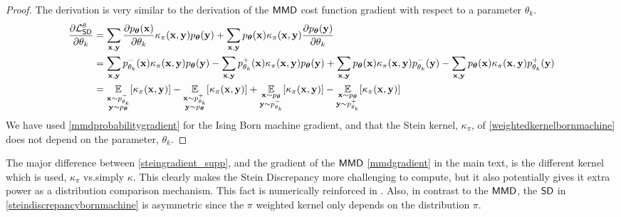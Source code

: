 \begin{proof}
The derivation is very similar to the derivation of the $\operatorname{\textsf{MMD}}$ cost function gradient with respect to a parameter $\theta_k$.
\begin{align*}
    \frac{\partial \mathcal{L}^{\theta}_{\operatorname{\textsf{SD}}}}{\partial \theta_k} &= \sum\limits_{\mathbf{x}, \mathbf{y}} \frac{\partial p_{\boldsymbol\theta}(\mathbf{x})}{\partial \theta_k} \kappa_\pi(\mathbf{x}, \mathbf{y}) p_{\boldsymbol\theta}(\mathbf{y}) +  \sum\limits_{\mathbf{x}, \mathbf{y}} p_{\boldsymbol\theta}(\mathbf{x})\kappa_\pi(\mathbf{x}, \mathbf{y})   \frac{\partial p_{\boldsymbol\theta}(\mathbf{y})}{\partial \theta_k}\\
    &=  \sum\limits_{\mathbf{x}, \mathbf{y}}p^-_{\theta_k}(\mathbf{x})  \kappa_\pi(\mathbf{x}, \mathbf{y}) p_{\boldsymbol\theta}(\mathbf{y}) -  \sum\limits_{\mathbf{x}, \mathbf{y}}p^+_{\theta_k}(\mathbf{x})  \kappa_\pi(\mathbf{x}, \mathbf{y}) p_{\boldsymbol\theta}(\mathbf{y}) +\sum\limits_{\mathbf{x}, \mathbf{y}} p_{\boldsymbol\theta}(\mathbf{x})\kappa_\pi(\mathbf{x}, \mathbf{y})   p^-_{\theta_k}(\mathbf{y}) -  \sum\limits_{\mathbf{x}, \mathbf{y}} p_{\boldsymbol\theta}(\mathbf{x})\kappa_\pi(\mathbf{x}, \mathbf{y})p^+_{\theta_k}(\mathbf{y})\\
    & = \underset{\substack{\mathbf{x} \sim p^-_{\theta_k} \\ \mathbf{y}\sim p_{\boldsymbol\theta}}}{\mathbb{E}}[\kappa_\pi(\mathbf{x}, \mathbf{y})] - \underset{\substack{\mathbf{x} \sim p^+_{\theta_k} \\ \mathbf{y}\sim p_{\boldsymbol\theta}}}{\mathbb{E}}[\kappa_\pi(\mathbf{x}, \mathbf{y})] +\underset{\substack{\mathbf{x} \sim p_{\boldsymbol\theta}\\ \mathbf{y}\sim p^-_{\theta_k}}}{\mathbb{E}}[\kappa_\pi(\mathbf{x}, \mathbf{y})] - \underset{\substack{\mathbf{x} \sim p_{\boldsymbol\theta} \\ \mathbf{y}\sim p^+_{\theta_k}}}{\mathbb{E}}[\kappa_\pi(\mathbf{x}, \mathbf{y})]
\end{align*}
We have used \eqref{mmdprobabilitygradient} for the Ising Born machine gradient,  and that the Stein kernel, $\kappa_{\pi}$, of \eqref{weightedkernelbornmachine} does not depend on the parameter, ${\theta_k}$.

\end{proof}

The major difference between \eqref{steingradient_supp}, and the gradient of the $\operatorname{\textsf{MMD}}$ \eqref{mmdgradient} in the main text, is the different kernel which is used, $\kappa_\pi$ vs.\@ simply $\kappa$. This clearly makes the Stein Discrepancy more challenging to compute, but it also potentially gives it extra power as a distribution comparison mechanism. This fact is numerically reinforced in . Also, in contrast to the $\operatorname{\textsf{MMD}}$, the $\operatorname{\textsf{SD}}$ in \eqref{steindiscrepancybornmachine} is asymmetric since the $\pi$ weighted kernel only depends on the distribution $\pi$.

